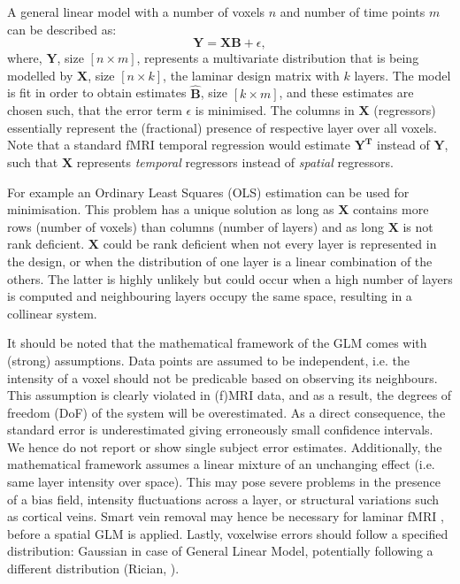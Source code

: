 A general linear model with a number of voxels $n$ and number of time points $m$ can be described as:
\begin{equation}
\mathbf{Y=X B} + \epsilon,
\label{eq:glm}
\end{equation}
where, $\mathbf{Y}$, size $[n\times m]$, represents a multivariate distribution that is being modelled by $\mathbf{X}$, size $[n\times k]$, the laminar design matrix with $k$ layers. The model is fit in order to obtain estimates $\hat{\mathbf{B}}$, size $[k\times m]$, and these estimates are chosen such, that the error term $\epsilon$ is minimised.
The columns in $\mathbf{X}$ (regressors) essentially represent the (fractional) presence of respective layer over all voxels. Note that a standard fMRI temporal regression would estimate $\mathbf{Y^T}$ instead of $\mathbf{Y}$, such that $\mathbf{X}$ represents \emph{temporal} regressors instead of \emph{spatial} regressors.

For example an Ordinary Least Squares (OLS) estimation can be used for minimisation. This problem has a unique solution as long as $\mathbf{X}$ contains more rows (number of voxels) than columns (number of layers) and as long $\mathbf{X}$ is not rank deficient. $\mathbf{X}$ could be rank deficient when not every layer is represented in the design, or when the distribution of one layer is a linear combination of the others. The latter is highly unlikely but could occur when a high number of layers is computed and neighbouring layers occupy the same space, resulting in a collinear system.

It should be noted that the mathematical framework of the GLM comes with (strong) assumptions. Data points are assumed to be independent, i.e. the intensity of a voxel should not be predicable based on observing its neighbours. This assumption is clearly violated in (f)MRI data, and as a result, the degrees of freedom (DoF) of the system will be overestimated. As a direct consequence, the standard error is underestimated giving erroneously small confidence intervals. We hence do not report or show single subject error estimates. Additionally, the mathematical framework assumes a linear mixture of an unchanging effect (i.e. same layer intensity over space). This may pose severe problems in the presence of a bias field, intensity fluctuations across a layer, or structural variations such as cortical veins. Smart vein removal may hence be necessary for laminar fMRI \cite{Koopmans2010,Fracasso2017}, before a spatial GLM is applied. Lastly, voxelwise errors should follow a specified distribution: Gaussian in case of General Linear Model, potentially following a different distribution (Rician, \cite{Gudbjartsson1995}). %

